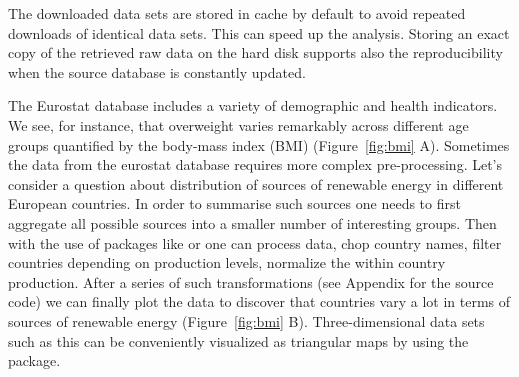 The downloaded data sets are stored in cache by default to avoid
repeated downloads of identical data sets. This can speed up the
analysis. Storing an exact copy of the retrieved raw data on the hard
disk supports also the reproducibility when the source database is
constantly updated.

The Eurostat database includes a variety of demographic and health
indicators. We see, for instance, that overweight varies remarkably
across different age groups quantified by the body-mass index (BMI)
(Figure~\ref{fig:bmi} A). Sometimes the data from the eurostat
database requires more complex pre-processing. Let's consider a
question about distribution of sources of renewable energy in
different European countries. In order to summarise such sources one
needs to first aggregate all possible sources into a smaller number of
interesting groups. Then with the use of packages like 
or  one can process data, chop country names, filter
countries depending on production levels, normalize the within country
production. After a series of such transformations (see Appendix for
the source code) we can finally plot the data to discover that
countries vary a lot in terms of sources of renewable energy
(Figure~\ref{fig:bmi} B). Three-dimensional data sets such as this can
be conveniently visualized as triangular maps by using
the  \citep{plotrix} package.


